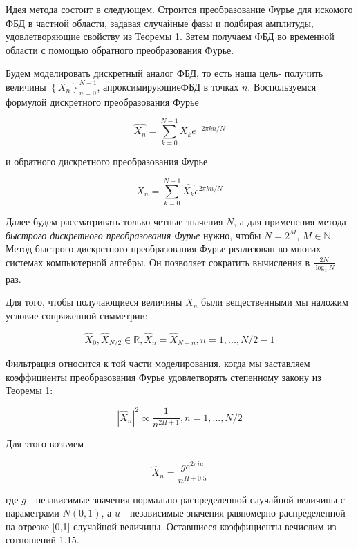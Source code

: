 Идея метода состоит в следующем. Строится преобразование Фурье для искомого ФБД в частной области, задавая случайные фазы и подбирая амплитуды, удовлетворяющие свойству из Теоремы 1. Затем получаем ФБД во временной области с помощью обратного преобразования Фурье.

Будем моделировать дискретный аналог ФБД, то есть наша цель- получить величины $\left\{X_n\right\}_{n=0}^{N-1}$, апроксимирующиеФБД в точках $n$. Воспользуемся формулой дискретного преобразования Фурье

\begin{equation}
	\hat{X_n} = \sum_{k=0}^{N-1}X_ke^{-2\pi kn/N}
\end{equation}

и обратного дискретного преобразования Фурье

\begin{equation}
	X_n = \sum_{k=0}^{N-1}\hat{X_k}e^{2\pi kn/N}
\end{equation}

Далее будем рассматривать только четные значения $N$, а для применения метода \textit{быстрого дискретного преобразования Фурье} нужно, чтобы $N=2^M$, $M \in \mathbb{N}$. Метод быстрого дискретного преобразования Фурье  реализован во многих системах компьютерной алгебры. Он позволяет сократить вычисления в $\frac{2N}{\log_2N}$ раз.

Для того, чтобы получающиеся величины $X_n$ были вещественными мы наложим условие сопряженной симметрии:

\begin{equation}
	\hat{X}_0, \hat{X}_{N/2} \in \mathbb{R}, \hat{X}_n = \hat{X}_{N-n}, n = 1,...,N/2-1
\end{equation}

Фильтрация относится к той части моделирования, когда мы заставляем коэффициенты преобразования Фурье удовлетворять степенному закону из Теоремы 1:

\begin{equation}
	|\hat{X}_n|^2 \propto \frac{1}{n^{2H+1}}, n = 1,...,N/2
\end{equation}

Для этого возьмем

\begin{equation}
	\hat{X}_n = \frac{ge^{2\pi iu}}{n^{H+0.5}}
\end{equation}

где $g$ - независимые значения нормально распределенной случайной величины с параметрами $N(0,1)$, а $u$ - независимые значения равномерно распределенной на отрезке [0,1] случайной величины. Оставшиеся коэффициенты вечислим из сотношений 1.15.

